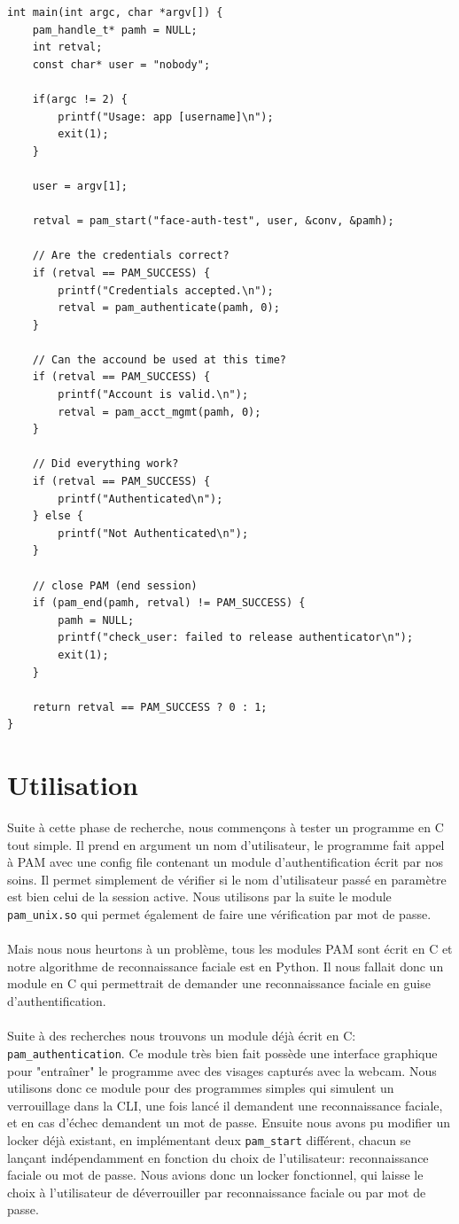 \documentclass{article}
\begin{document}
\begin{itemize}
\begin{verbatim}
int main(int argc, char *argv[]) {
	pam_handle_t* pamh = NULL;
	int retval;
	const char* user = "nobody";

	if(argc != 2) {
		printf("Usage: app [username]\n");
		exit(1);
	}

	user = argv[1];

	retval = pam_start("face-auth-test", user, &conv, &pamh);

	// Are the credentials correct?
	if (retval == PAM_SUCCESS) {
		printf("Credentials accepted.\n");
		retval = pam_authenticate(pamh, 0);
	}

	// Can the accound be used at this time?
	if (retval == PAM_SUCCESS) {
		printf("Account is valid.\n");
		retval = pam_acct_mgmt(pamh, 0);
	}

	// Did everything work?
	if (retval == PAM_SUCCESS) {
		printf("Authenticated\n");
	} else {
		printf("Not Authenticated\n");
	}

	// close PAM (end session)
	if (pam_end(pamh, retval) != PAM_SUCCESS) {
		pamh = NULL;
		printf("check_user: failed to release authenticator\n");
		exit(1);
	}

	return retval == PAM_SUCCESS ? 0 : 1;
}
    \end{verbatim}
  \end{itemize}

  \section{Utilisation}

  Suite à cette phase de recherche, nous commençons à tester un programme en C
  tout simple. Il prend en argument un nom d’utilisateur, le programme fait
  appel à PAM avec une config file contenant un module d’authentification écrit
  par nos soins. Il permet simplement de vérifier si le nom d’utilisateur passé
  en paramètre est bien celui de la session active. Nous utilisons par la suite
  le module \texttt{pam\_unix.so} qui permet également de faire une
  vérification par mot de passe.
\\ \\
  Mais nous nous heurtons à un problème, tous les modules PAM sont écrit en C
  et notre algorithme de reconnaissance faciale est en Python. Il nous fallait
  donc un module en C qui permettrait de demander une reconnaissance faciale en
  guise d’authentification.
\\ \\
  Suite à des recherches nous trouvons un module déjà écrit en C:
\texttt{pam\_authentication}. Ce module très bien fait possède une interface
graphique pour "entraîner" le programme avec des visages capturés avec la
webcam. Nous utilisons donc ce module pour des programmes simples qui simulent un
verrouillage dans la CLI,  une fois lancé il demandent une reconnaissance faciale,
et en cas d’échec demandent un mot de passe. Ensuite nous avons pu modifier un
locker déjà existant, en implémentant deux \texttt{pam\_start} différent,
chacun se lançant indépendamment en fonction du choix de l’utilisateur:
reconnaissance faciale ou mot de passe. Nous avions donc un locker fonctionnel,
qui laisse le choix à l’utilisateur de déverrouiller par reconnaissance faciale
ou par mot de passe.
\end{document}

